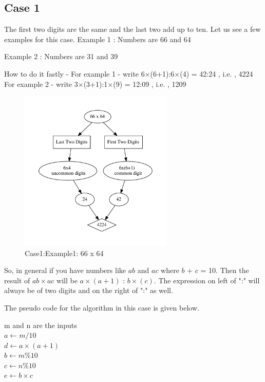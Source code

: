 \documentclass[a4paper,10pt]{article}
\begin{document}
\subsection {Case 1} \label{casea}
The first two digits are the same and the last two add up to ten.
\newline
Let us see a few examples for this case.
\newline
Example 1 : Numbers are 66 and 64
\begin{center}
\qquad
\end{center}
Example 2 : Numbers are 31 and 39
\begin{center}
\qquad
\end{center}
How to do it fastly - \newline
For example 1 - write 6$\times$(6+1):6$\times$(4) = 42:24 , i.e. , 4224 \newline
For example 2 - write 3$\times$(3+1):1$\times$(9) = 12:09 , i.e. , 1209 \newline
\begin{figure}
    \centering
    \includegraphics[width=0.65\textwidth]{figure.pdf}
    \caption{Case1:Example1: 66 x 64 }
    \label{fig:my_label}
\end{figure}
So, in general if you have numbers like $ab$ and $ac$ where $b$ + $c$ = 10. Then the result of $ab \times ac$ will be $a\times(a+1)$ : $b\times(c)$. The expression on left of ":" will always be of two digits and on the right of ":" as well.

The pseudo code for the algorithm in this case is given below.

\begin{algorithm}[H]
m and n are the inputs \\
$a \gets m/10$ \\
$d \gets a\times(a+1)$ \\
$b \gets m\%10$ \\
$c \gets n\%10$ \\
$e \gets b\times c$ \\
\caption{Multiply for \ref{casea}}
\end{algorithm}
\end{document}
